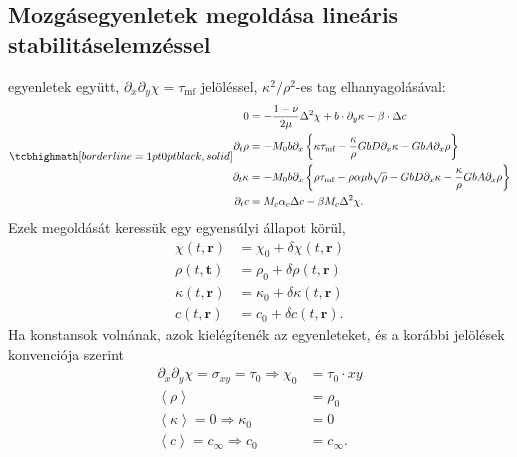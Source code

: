 \documentclass[10pt,a4paper]{scrartcl}
\let\mathbf\bm
\begin{document}
\subsection{Mozgásegyenletek megoldása lineáris stabilitáselemzéssel}
 egyenletek együtt, $\partial_x \partial_y \chi = {\tau _{{\text{mf}}}}$ jelöléssel, $\kappa^2/\rho^2$-es tag elhanyagolásával:
\begin{gather} \label{eq:eom}
\tcbhighmath[borderline={1pt}{0pt}{black,solid}]{
\begin{aligned}
0 & = - \frac{{1 - \nu }}{{2\mu }}{\Delta ^2}\chi  + b\cdot\partial_y\kappa - \beta  \cdot \Delta c \\ 
    {\partial _t}\rho  &  =  - {M_0}b{\partial _x}\left\{ {\kappa {\tau _{{\text{mf}}}} - \frac{\kappa }{\rho }GbD{\partial _x}\kappa  - GbA{\partial _x}\rho } \right\} \\ 
  {\partial _t}\kappa  &  =  - {M_0}b{\partial _x}\left\{ {\rho {\tau _{{\text{mf}}}} - \rho \alpha \mu b\sqrt \rho - GbD{\partial _x}\kappa  - \frac{\kappa }{\rho } GbA{\partial _x}\rho } \right\} \\
  \partial_t c & =  {M_c}{\alpha _c}\Delta c - \beta {M_c}\Delta^2 \chi.
\end{aligned}  }
\end{gather}
Ezek megoldását keressük egy egyensúlyi állapot körül,
\[\begin{aligned}
  \chi \left( {t,{\mathbf{r}}} \right) &  = {\chi _0} + \delta \chi \left( {t,{\mathbf{r}}} \right) \\ 
  \rho \left( {t,{\mathbf{t}}} \right) &  = {\rho _0} + \delta \rho \left( {t,{\mathbf{r}}} \right) \\ 
  \kappa \left( {t,{\mathbf{r}}} \right) &  = {\kappa _0} + \delta \kappa \left( {t,{\mathbf{r}}} \right) \\ 
  c\left( {t,{\mathbf{r}}} \right) &  = {c_0} + \delta c\left( {t,{\mathbf{r}}} \right).
\end{aligned} \]
Ha konstansok volnának, azok kielégítenék az egyenleteket, és a korábbi jelölések konvenciója szerint 
\[\begin{aligned}
  {\partial _x}{\partial _y}\chi  = {\sigma _{xy}} = {\tau _0} \Rightarrow {\chi _0} &  = {\tau _0} \cdot xy \\ 
  \left\langle \rho  \right\rangle  &  = {\rho _0} \\ 
  \left\langle \kappa  \right\rangle  = 0 \Rightarrow {\kappa _0} &  = 0 \\ 
  \left\langle c \right\rangle  = {c_\infty } \Rightarrow {c_0} &  = {c_\infty }. \\ 
\end{aligned} \]
\end{document}
